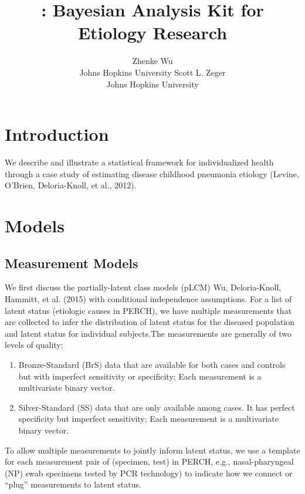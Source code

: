 \documentclass[article]{jss}
\author{
Zhenke Wu\\Johns Hopkins University \And Scott L. Zeger\\Johns Hopkins University
}
\title{\pkg{baker}: Bayesian Analysis Kit for Etiology Research}
\begin{document}
\section{Introduction}\label{introduction}

We describe and illustrate a statistical framework for individualized
health through a case study of estimating disease childhood pneumonia
etiology (Levine, O'Brien, Deloria-Knoll, et al., 2012).

\section{Models}\label{models}

\subsection{Measurement Models}\label{measurement-models}

We first discuss the partially-latent class models (pLCM) Wu,
Deloria-Knoll, Hammitt, et al. (2015) with conditional independence
assumptions. For a list of latent status (etiologic causes in PERCH), we
have multiple measurements that are collected to infer the distribution
of latent status for the diseased population and latent status for
individual subjects.The measurements are generally of two levels of
quality:

\begin{enumerate}
\def\labelenumi{\arabic{enumi}.}
\itemsep1pt\parskip0pt
\item
  Bronze-Standard (BrS) data that are available for both cases and
  controls but with imperfect sensitivity or specificity; Each
  measurement is a multivariate binary vector.
\item
  Silver-Standard (SS) data that are only available among cases. It has
  perfect specificity but imperfect sensitivity; Each measurement is a
  multivariate binary vector.
\end{enumerate}

To allow multiple measurements to jointly inform latent status, we use a
template for each measurement pair of (specimen, test) in PERCH, e.g.,
nasal-pharyngeal (NP) swab specimens tested by PCR technology) to
indicate how we connect or ``plug'' measurements to latent status.
\end{document}

